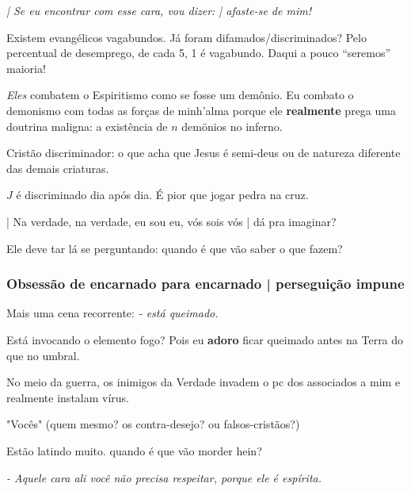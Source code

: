 \documentclass[12pt,a4paper]{article}
\begin{document}
			\begin{flushright}
			\end{flushright}

			\emph{| Se eu encontrar com esse cara, vou dizer: | afaste-se de mim!}

			Existem evang\'elicos vagabundos. J\'a foram difamados/discriminados? Pelo percentual de desemprego, de cada 5, 1 \'e vagabundo. Daqui a pouco \textquotedblleft seremos\textquotedblright\, maioria!

			\begin{flushright}
			\end{flushright}

			\emph{Eles} combatem o Espiritismo como se fosse um dem\^onio. Eu combato o demonismo com todas as for\c{c}as de minh'alma porque ele \textbf{realmente} prega uma doutrina maligna: a exist\^encia de $n$ dem\" onios no inferno.

			Crist\~ao discriminador: o que acha que Jesus \'e semi-deus ou de natureza diferente das demais criaturas.

			$J$ \'e discriminado dia ap\'os dia. \'E pior que jogar pedra na cruz.

			| Na verdade, na verdade, eu sou eu, v\'os sois vós | d\'a pra imaginar?

			Ele deve tar l\'a se perguntando: quando \'e que v\~ao saber o que fazem?

			\subsubsection{Obsess\~ao de encarnado para encarnado | persegui\c{c}\~ao impune}
				\begin{flushright}
				\end{flushright}

				Mais uma cena recorrente: \emph{- est\'a queimado.} %

				Est\'a invocando o elemento fogo? Pois eu \textbf{adoro} ficar queimado antes na Terra do que no umbral.

				No meio da guerra, os inimigos da Verdade invadem o pc dos associados a mim e realmente instalam v\'irus.

				"Voc\^es" (quem mesmo? os contra-desejo? ou falsos-crist\~aos?)

				Est\~ao latindo muito. quando \'e que v\~ao morder hein?

				\emph{- Aquele cara ali voc\^e n\~ao precisa respeitar, porque ele \'e esp\'irita.}
\end{document}
